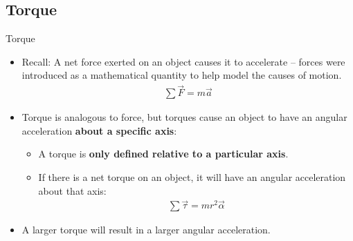 \documentclass[aspectratio=169,
hyperref={colorlinks,urlcolor=blue}
]{beamer}
\begin{document}


\subsection{Torque}
\label{subsec:torque}
\begin{frame}{Torque}
\begin{itemize}
\item Recall: A net force exerted on an object causes it to accelerate – forces were introduced as a mathematical quantity to help model the causes of motion.
\begin{align*}
\sum \vec F = m\vec a
\end{align*}
\item Torque is analogous to force, but torques cause an object to have an angular acceleration \textbf{about a specific axis}:
\begin{itemize}
\item A torque is \textbf{only defined relative to a particular axis}.
\item If there is a net torque on an object, it will have an angular acceleration about that axis:
\begin{align*}
\sum \vec \tau=mr^2\vec \alpha
\end{align*}
\end{itemize}
\item[$\rightarrow$]  A larger torque will result in a larger angular acceleration.
\end{itemize}
\end{frame}
\end{document}
